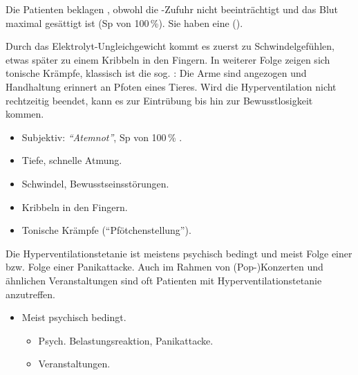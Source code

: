 
{%
Die Patienten beklagen , obwohl die -Zufuhr nicht
beeinträchtigt und das Blut maximal gesättigt ist (Sp von 100\,\%). Sie
haben eine  ().

Durch das Elektrolyt-Ungleichgewicht kommt es zuerst zu Schwindelgefühlen, etwas
später zu einem Kribbeln in den Fingern. In weiterer Folge zeigen sich tonische
Krämpfe, klassisch ist die sog. :
Die Arme sind angezogen und Handhaltung erinnert an Pfoten eines Tieres. Wird
die Hyperventilation nicht rechtzeitig beendet, kann es zur
Eintrübung bis hin zur Bewusstlosigkeit kommen.

}{
\begin{itemize}
  \item Subjektiv: \emph{"`Atemnot"'}, Sp von 100\,\% .
  \item Tiefe, schnelle Atmung.
  \item Schwindel, Bewusstseinsstörungen.
  \item Kribbeln in den Fingern.
  \item Tonische Krämpfe ("`Pfötchenstellung"').
\end{itemize}
}{}{}{}

{%
Die Hyperventilationstetanie ist meistens psychisch bedingt und meist Folge
einer  bzw. Folge einer Panikattacke. Auch
im Rahmen von (Pop-)Konzerten und ähnlichen Veranstaltungen sind oft Patienten mit
Hyperventilationstetanie anzutreffen.

}{
\begin{itemize}
  \item Meist psychisch bedingt.
  \begin{itemize}
    \item Psych. Belastungsreaktion, Panikattacke.
    \item Veranstaltungen.
  \end{itemize}
\end{itemize}
}{}{}{}

